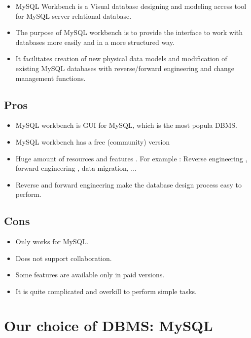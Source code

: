 \documentclass[a4paper]{article}
\numberwithin{equation}{section}
\begin{document}
\begin{itemize}
  \item MySQL Workbench is a Visual database designing and modeling access tool for MySQL server relational database.
  \item The purpose of MySQL workbench is to provide the interface to work with databases more easily and in a more structured way.
  \item It facilitates creation of new physical data models and modification of existing MySQL databases with reverse/forward engineering and change management functions.
\end{itemize}

\subsection{Pros}
\begin{itemize}
  \item MySQL workbench is GUI for MySQL, which is the most popula DBMS.
  \item MySQL workbench has a free (community) version
  \item Huge amount of resources and features . For example : Reverse engineering , forward engineering , data migration, ...
  \item Reverse and forward engineering make the database design process easy to perform. %
\end{itemize}

\subsection{Cons}
\begin{itemize}
  \item Only works for MySQL.
  \item Does not support collaboration.
  \item Some features are available only in paid versions.
  \item It is quite complicated and overkill to perform simple tasks.
\end{itemize}

\newpage


\section{Our choice of DBMS: MySQL }
\end{document}
